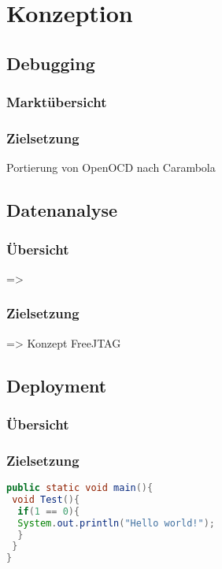\chapter{Konzeption}
\minitoc
\section{Debugging}
\subsection{Marktübersicht}

\subsection{Zielsetzung}
Portierung von OpenOCD nach Carambola 
\section{Datenanalyse}
\subsection{Übersicht}
=> 
\subsection{Zielsetzung}
=> Konzept FreeJTAG
\section{Deployment}
\subsection{Übersicht}
\subsection{Zielsetzung}

\begin{lstlisting}[language=java]
public static void main(){
 void Test(){
  if(1 == 0){
  System.out.println("Hello world!");
  }
 }
}
\end{lstlisting}
\lipsum
